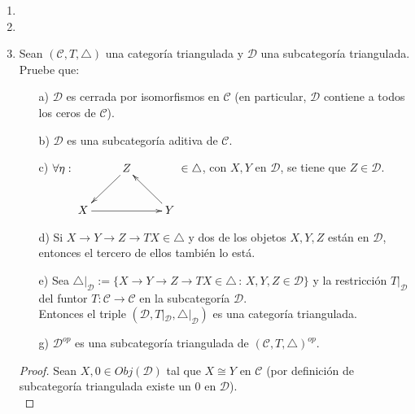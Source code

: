 \documentclass{article}
\begin{document}
\begin{enumerate}
\begin{proof}
Ahora, por el lema de Yoneda existe $g:B\to A$ tal que \\$\operatorname{Hom}^{-1}_{\mathscr{C}}(A,h)= 
\operatorname{Hom}_{\mathscr{C}}(A,g)$ en particular \\
$h\circ g=\operatorname{Hom}^{-1}_{\mathscr{C}}(A,h)(g)=
\operatorname{Hom}_{\mathscr{C}}(A,h)\operatorname{Hom}^{-1}_{\mathscr{C}}(A,h)(1_B) =1_B$ y \\
$g\circ h=\operatorname{Hom}^{-1}_{\mathscr{C}}(A,h)\operatorname{Hom}_{\mathscr{C}}(A,h)(1_A)=1_A$ 
por lo que $h$ es isomorfismo.

\end{proof}

\item
\item
\item Sean $(\mathscr{C},T,\triangle)$ una categoría triangulada y $\mathscr{D}$ una subcategoría triangulada. Pruebe que:
\begin{itemize}
\item[a)] $\mathscr{D}$ es cerrada por isomorfismos en $\mathscr{C}$ (en particular, $\mathscr{D}$ contiene a todos los ceros de $\mathscr{C}$).

\item[b)] $\mathscr{D}$ es una subcategoría aditiva de  $\mathscr{C}$.

\item[c)] $\forall \eta:\xymatrix{&Z\ar[ld]&\\ X\ar[rr] & &Y\ar[ul]}\in \triangle $, con $X,Y$ en $\mathscr{D}$, se tiene que $Z\in \mathscr{D}$.

\item[d)] Si $X\to Y\to Z\to TX \in \triangle$ y dos de los objetos $X,Y,Z$ están en $\mathscr{D}$, entonces el tercero de ellos también lo está.

\item[e)] Sea $\triangle|_\mathscr{D}:=\{X\to Y\to Z\to TX \in \triangle\,:\, X,Y,Z\in \mathscr{D}\}$ y la
restricción $T|_\mathscr{D}$ del funtor $T:\mathscr{C}\to\mathscr{C}$ en la subcategoría $\mathscr{D}$.\\
Entonces el triple $(\mathscr{D},T|_\mathscr{D},\triangle|_\mathscr{D})$ es una categoría triangulada.

\item[g)] $\mathscr{D}^{op}$ es una subcategoría triangulada de $(\mathscr{C},T,\triangle)^{op}$.
\end{itemize}

\begin{proof}
 Sean $X,0\in Obj(\mathscr{D})$ tal que $X\cong Y$ en $\mathscr{C}$ (por definición de subcategoría triangulada existe un $0$ en 
$\mathscr{D}$).\\


\end{proof}
\end{enumerate}
\end{document}
